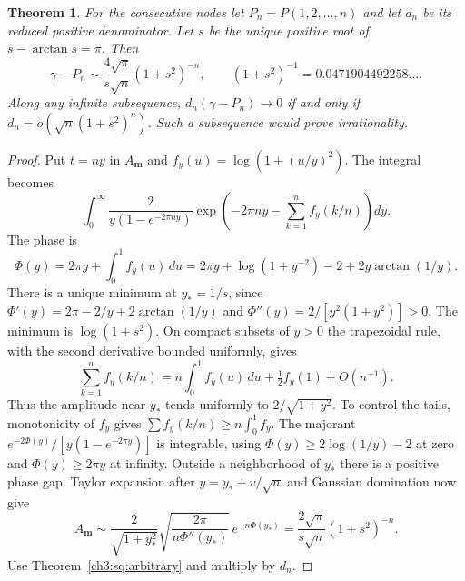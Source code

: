 \documentclass[11pt,a4paper,oneside,openany]{report}
\newtheorem{theorem}{Theorem}[section]
\theoremstyle{remark}\newtheorem{remark}[theorem]{Remark}
\numberwithin{equation}{section}
\begin{document}
\begin{theorem}\label{ch3:sq:rate}
For the consecutive nodes let $P_n=P(1,2,\ldots,n)$ and let $d_n$ be its reduced positive denominator. Let $s$ be the unique positive root of $s-\arctan s=\pi$. Then
\[
 \gamma-P_n\sim \frac{4\sqrt{\pi}}{s\sqrt n}(1+s^2)^{-n},
 \qquad (1+s^2)^{-1}=0.0471904492258\ldots .
\]
Along any infinite subsequence, $d_n(\gamma-P_n)\to0$ if and only if $d_n=o(\sqrt n(1+s^2)^n)$. Such a subsequence would prove irrationality.
\end{theorem}
\begin{proof}
Put $t=ny$ in $A_{\mathbf m}$ and $f_y(u)=\log(1+(u/y)^2)$. The integral becomes
\[
 \int_0^\infty \frac{2}{y(1-e^{-2\pi ny})}
       \exp\!\left(-2\pi ny-\sum_{k=1}^n f_y(k/n)\right)dy.
\]
The phase is
\[
 \Phi(y)=2\pi y+\int_0^1 f_y(u)\,du
 =2\pi y+\log(1+y^{-2})-2+2y\arctan(1/y).
\]
There is a unique minimum at $y_*=1/s$, since
$\Phi'(y)=2\pi-2/y+2\arctan(1/y)$ and
$\Phi''(y)=2/[y^2(1+y^2)]>0$.
The minimum is $\log(1+s^2)$. On compact subsets of $y>0$ the trapezoidal rule, with the second derivative bounded uniformly, gives
\[
 \sum_{k=1}^n f_y(k/n)=n\int_0^1 f_y(u)\,du+\tfrac12 f_y(1)+O(n^{-1}).
\]
Thus the amplitude near $y_*$ tends uniformly to $2/\sqrt{1+y^2}$. To control the tails, monotonicity of $f_y$ gives $\sum f_y(k/n)\ge n\int_0^1 f_y$. The majorant $e^{-2\Phi(y)}/[y(1-e^{-2\pi y})]$ is integrable, using $\Phi(y)\ge2\log(1/y)-2$ at zero and $\Phi(y)\ge2\pi y$ at infinity. Outside a neighborhood of $y_*$ there is a positive phase gap. Taylor expansion after $y=y_*+v/\sqrt n$ and Gaussian domination now give
\[
 A_{\mathbf m}\sim
 \frac{2}{\sqrt{1+y_*^2}}\sqrt{\frac{2\pi}{n\Phi''(y_*)}}\,
                 e^{-n\Phi(y_*)}
 =\frac{2\sqrt{\pi}}{s\sqrt n}(1+s^2)^{-n}.
\]
Use Theorem~\ref{ch3:sq:arbitrary} and multiply by $d_n$.
\end{proof}
\end{document}
